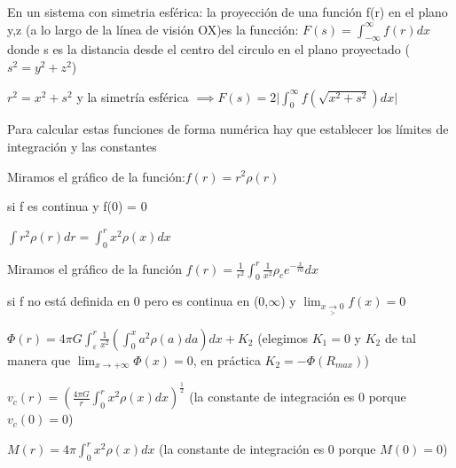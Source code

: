 \documentclass[12pt]{book}
\begin{document}
\begin{description}
\item En un sistema con simetria esférica: la proyección de una función f(r) en el plano y,z (a lo largo de la línea de visión OX)es la funcción: 
$F(s) = \int_{-\infty}^\infty{f(r)dx}$ donde s es la distancia desde el centro del circulo en el plano proyectado ($s^2 = y^2 + z^2$)
\item $r^2 = x^2 + s^2$ y la simetría esférica $ \implies  F(s) =  2\lvert \int_0^\infty{f(\sqrt{x^2+s^2})dx} \rvert  $


\item Para calcular estas funciones de forma numérica hay que establecer los límites de integración y las constantes
\item Miramos el gráfico de la función:$ f(r) = r^2 \rho(r)$
\item si  f es  continua y f(0) = 0
\item  $\int{r^2 \rho(r) dr} = \int_0^r{x^2 \rho(x) dx}$
\item Miramos el gráfico de la función $f(r) = \frac{1}{r^2}  \int_0^r{\frac{1}{x^2}\rho_c  e^{-\frac{x}{r0}}dx }$
\item si f no está definida en 0 pero es continua en (0,$\infty$) y $  \lim_{x \underset{>}{\to} 0} f(x) = 0$
\item $\Phi(r) = 4 \pi G  \int_\varepsilon^r{ \frac{1}{x^2}(\int_0^x{a^2 \rho(a)da})dx} + K_2$
(elegimos $K_1 = 0$ y $K_2$  de tal manera que $\lim_{x \to +\infty}\Phi(x) = 0 $, en práctica $K_2 = -\Phi(R_{max})$) 
\item $v_c(r) = (\frac{4 \pi G }{r}\int_0^r{x^2 \rho(x)dx} )^{\frac{1}{2}}  $ (la constante de integración es 0 porque $v_c(0) = 0$)
\item $M(r) = 4 \pi \int_0^r{x^2 \rho(x)dx}$ (la constante de integración es 0 porque $M(0) = 0$) 
\end{description}
\end{document}

